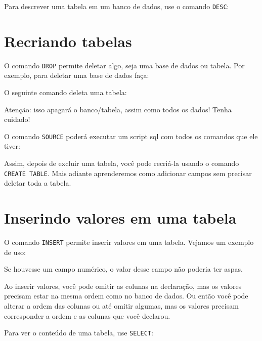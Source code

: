 Para descrever uma tabela em um banco de dados, use o comando \verb|DESC|:


\section{Recriando tabelas}
\label{sec:recriando_tabelas}

O comando \verb|DROP| permite deletar algo, seja uma base de dados ou tabela. Por exemplo, para deletar uma base de dados faça:


O seguinte comando deleta uma tabela:


\begin{observacao}
Atenção: isso apagará o banco/tabela, assim como todos os dados! Tenha cuidado!
\end{observacao}

\begin{observacao}
O comando \verb|SOURCE| poderá executar um script sql com todos os comandos que ele tiver:

\end{observacao}

Assim, depois de excluir uma tabela, você pode recriá-la usando o comando \verb|CREATE TABLE|. Mais adiante aprenderemos como adicionar campos sem precisar deletar toda a tabela.

\section{Inserindo valores em uma tabela}
\label{sec:inserindo_dados_tabela}

O comando \verb|INSERT| permite inserir valores em uma tabela. Vejamos um exemplo de uso:


Se houvesse um campo numérico, o valor desse campo não poderia ter aspas.

Ao inserir valores, você pode omitir as colunas na declaração, mas os valores precisam estar na mesma ordem como no banco de dados. Ou então você pode alterar a ordem das colunas ou até omitir algumas, mas os valores precisam corresponder a ordem e as colunas que você declarou.

Para ver o conteúdo de uma tabela, use \verb|SELECT|:

